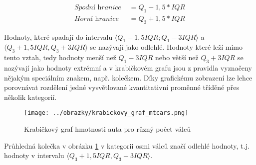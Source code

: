 \begin{align}
    \textit{Spodní hranice } &= Q_1 - 1,5 * IQR \\
    \textit{Horní hranice } &= Q_3 + 1,5 * IQR
\end{align}

Hodnoty, které spadají do intervalu $\langle Q_1 - 1,5IQR; Q_1 - 3IQR\rangle$ a $\langle Q_3 + 1,5IQR, Q_3 + 3IQR \rangle$ se nazývají jako odlehlé.
Hodnoty které leží mimo tento vztah, tedy hodnoty menší než $Q_1 - 3IQR$ nebo větší než $Q_3 + 3IQR$ se nazývají jako hodnoty extrémní a
v krabičkovém grafu jsou z pravidla vyznačeny nějakým speciálním znakem, např. kolečkem.
Díky grafickému zobrazení lze lehce porovnávat rozdělení jedné vysvětlované kvantitativní proměnné tříděné přes několik kategorií.

\begin{figure}[H]
    \centering
    \texttt{[image: ../obrazky/krabickovy\_graf\_mtcars.png]}
    \caption{Krabičkový graf hmotnosti auta pro různý počet válců} 
    \label{fig:krabickovy_graf_mtcars}
\end{figure}

Průhledná kolečka v obrázku \ref{fig:krabickovy_graf_mtcars} v kategorii osmi válců značí odlehlé hodnoty, t.j. hodnoty
v intervalu $\langle Q_3 + 1,5IQR, Q_3 + 3IQR \rangle$.

